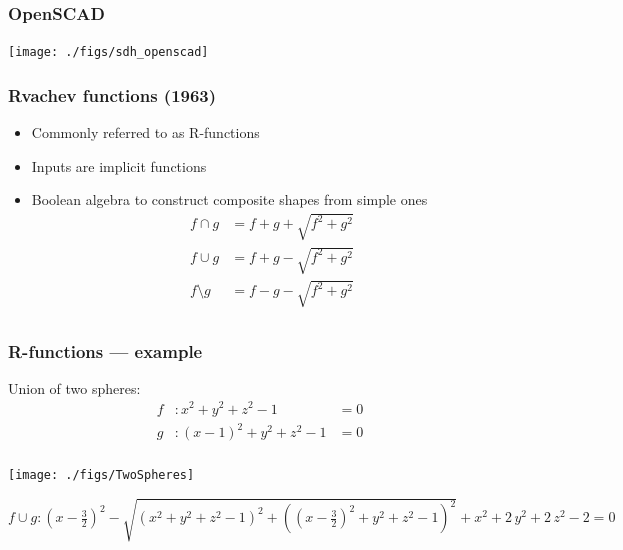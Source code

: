 \documentclass{beamer}
\begin{document}
\begin{frame}
\frametitle{OpenSCAD} 
\centerline{\texttt{[image: ./figs/sdh\_openscad]}} 
\end{frame}

\begin{frame}[t] 
\frametitle{Rvachev functions (1963)} 
\begin{itemize} 
\item Commonly referred to as R-functions 
\item Inputs are implicit functions
\item Boolean algebra to construct composite shapes from simple ones 
\[
    \begin{aligned}
    f \cap g &= f + g + \sqrt{f^2 + g^2}       \\ 
    f \cup g &= f + g - \sqrt{f^2 + g^2}       \\
    f \setminus g &= f - g - \sqrt{f^2 + g^2}  \\
    \end{aligned}
\]
\end{itemize} 
\end{frame}
\begin{frame}[t] 
\frametitle{R-functions --- example} 
Union of two spheres:
\[
   \begin{aligned}
   f&: x^2+y^2+z^2 - 1 &= 0 \\
   g&: (x-1)^2+y^2+z^2 - 1 &= 0 \\
   \end{aligned}
\]


\begin{center}
{\tiny
\centerline{\texttt{[image: ./figs/TwoSpheres]}} 
\vspace{-3mm}
$
f \cup g: {\left(x-\frac{3}{2}\right)}^2-\sqrt{{\left(x^2+y^2+z^2-1\right)}^2+{\left({\left(x-\frac{3}{2}\right)}^2+y^2+z^2-1\right)}^2}+x^2+2\,y^2+2\,z^2-2 = 0$ 
}
\end{center}
\end{frame} 

\end{document}
